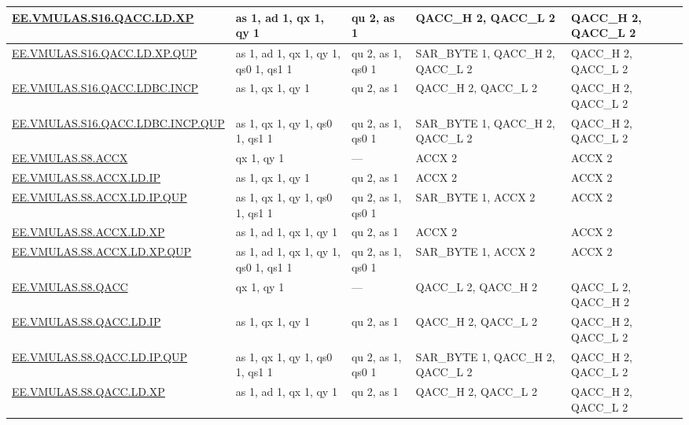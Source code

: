 \begin{longtable}[c]{|l|m{2.5cm}|m{2.5cm}|m{2.5cm}|m{2.5cm}|}
    \hyperref[instruction:EEVMULASS16QACCLDXP]{EE.VMULAS.S16.QACC.LD.XP} & as 1, ad 1, qx 1, qy 1 & qu 2, as 1 & QACC\_H 2, QACC\_L 2 & QACC\_H 2, QACC\_L 2\\\hline
    \hyperref[instruction:EEVMULASS16QACCLDXPQUP]{EE.VMULAS.S16.QACC.LD.XP.QUP} & as 1, ad 1, qx 1, qy 1, qs0 1, qs1 1 & qu 2, as 1, qs0 1 & SAR\_BYTE 1, QACC\_H 2, QACC\_L 2 & QACC\_H 2, QACC\_L 2\\\hline
    \hyperref[instruction:EEVMULASS16QACCLDBCINCP]{EE.VMULAS.S16.QACC.LDBC.INCP} & as 1, qx 1, qy 1 & qu 2, as 1 & QACC\_H 2, QACC\_L 2 & QACC\_H 2, QACC\_L 2\\\hline
    \hyperref[instruction:EEVMULASS16QACCLDBCINCPQUP]{EE.VMULAS.S16.QACC.LDBC.INCP.QUP} & as 1, qx 1, qy 1, qs0 1, qs1 1 & qu 2, as 1, qs0 1 & SAR\_BYTE 1, QACC\_H 2, QACC\_L 2 & QACC\_H 2, QACC\_L 2\\\hline
    \hyperref[instruction:EEVMULASS8ACCX]{EE.VMULAS.S8.ACCX} & qx 1, qy 1 & — & ACCX 2 & ACCX 2\\\hline
    \hyperref[instruction:EEVMULASS8ACCXLDIP]{EE.VMULAS.S8.ACCX.LD.IP} & as 1, qx 1, qy 1 & qu 2, as 1 & ACCX 2 & ACCX 2\\\hline
    \hyperref[instruction:EEVMULASS8ACCXLDIPQUP]{EE.VMULAS.S8.ACCX.LD.IP.QUP} & as 1, qx 1, qy 1, qs0 1, qs1 1 & qu 2, as 1, qs0 1 & SAR\_BYTE 1, ACCX 2 & ACCX 2\\\hline
    \hyperref[instruction:EEVMULASS8ACCXLDXP]{EE.VMULAS.S8.ACCX.LD.XP} & as 1, ad 1, qx 1, qy 1 & qu 2, as 1 & ACCX 2 & ACCX 2\\\hline
    \hyperref[instruction:EEVMULASS8ACCXLDXPQUP]{EE.VMULAS.S8.ACCX.LD.XP.QUP} & as 1, ad 1, qx 1, qy 1, qs0 1, qs1 1 & qu 2, as 1, qs0 1 & SAR\_BYTE 1, ACCX 2 & ACCX 2\\\hline
    \hyperref[instruction:EEVMULASS8QACC]{EE.VMULAS.S8.QACC} & qx 1, qy 1 & — & QACC\_L 2, QACC\_H 2 & QACC\_L 2, QACC\_H 2\\\hline
    \hyperref[instruction:EEVMULASS8QACCLDIP]{EE.VMULAS.S8.QACC.LD.IP} & as 1, qx 1, qy 1 & qu 2, as 1 & QACC\_H 2, QACC\_L 2 & QACC\_H 2, QACC\_L 2\\\hline
    \hyperref[instruction:EEVMULASS8QACCLDIPQUP]{EE.VMULAS.S8.QACC.LD.IP.QUP} & as 1, qx 1, qy 1, qs0 1, qs1 1 & qu 2, as 1, qs0 1 & SAR\_BYTE 1, QACC\_H 2, QACC\_L 2 & QACC\_H 2, QACC\_L 2\\\hline
    \hyperref[instruction:EEVMULASS8QACCLDXP]{EE.VMULAS.S8.QACC.LD.XP} & as 1, ad 1, qx 1, qy 1 & qu 2, as 1 & QACC\_H 2, QACC\_L 2 & QACC\_H 2, QACC\_L 2\\\hline

\end{longtable}
